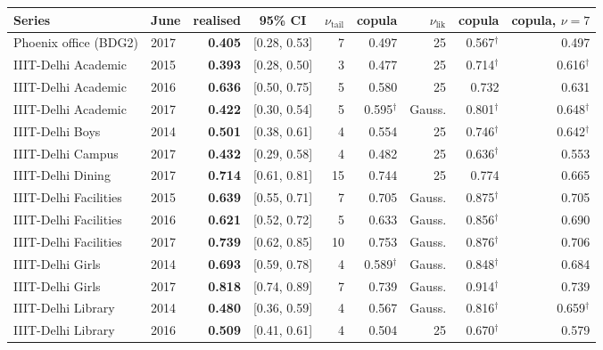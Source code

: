 \begin{table}[t]
\centering
\scriptsize
\setlength{\tabcolsep}{3pt}
\begin{tabular}{llrcrrrrr}
\toprule
Series & June & realised & 95\% CI & $\nu_{\mathrm{tail}}$ & copula & $\nu_{\mathrm{lik}}$ & copula & copula, $\nu{=}7$ \\
\midrule
Phoenix office (BDG2) & 2017 & \textbf{0.405} & [0.28, 0.53] & 7 & 0.497 & 25 & 0.567$^\dagger$ & 0.497 \\
\midrule
IIIT-Delhi Academic & 2015 & \textbf{0.393} & [0.28, 0.50] & 3 & 0.477 & 25 & 0.714$^\dagger$ & 0.616$^\dagger$ \\
IIIT-Delhi Academic & 2016 & \textbf{0.636} & [0.50, 0.75] & 5 & 0.580 & 25 & 0.732 & 0.631 \\
IIIT-Delhi Academic & 2017 & \textbf{0.422} & [0.30, 0.54] & 5 & 0.595$^\dagger$ & Gauss. & 0.801$^\dagger$ & 0.648$^\dagger$ \\
IIIT-Delhi Boys & 2014 & \textbf{0.501} & [0.38, 0.61] & 4 & 0.554 & 25 & 0.746$^\dagger$ & 0.642$^\dagger$ \\
IIIT-Delhi Campus & 2017 & \textbf{0.432} & [0.29, 0.58] & 4 & 0.482 & 25 & 0.636$^\dagger$ & 0.553 \\
IIIT-Delhi Dining & 2017 & \textbf{0.714} & [0.61, 0.81] & 15 & 0.744 & 25 & 0.774 & 0.665 \\
IIIT-Delhi Facilities & 2015 & \textbf{0.639} & [0.55, 0.71] & 7 & 0.705 & Gauss. & 0.875$^\dagger$ & 0.705 \\
IIIT-Delhi Facilities & 2016 & \textbf{0.621} & [0.52, 0.72] & 5 & 0.633 & Gauss. & 0.856$^\dagger$ & 0.690 \\
IIIT-Delhi Facilities & 2017 & \textbf{0.739} & [0.62, 0.85] & 10 & 0.753 & Gauss. & 0.876$^\dagger$ & 0.706 \\
IIIT-Delhi Girls & 2014 & \textbf{0.693} & [0.59, 0.78] & 4 & 0.589$^\dagger$ & Gauss. & 0.848$^\dagger$ & 0.684 \\
IIIT-Delhi Girls & 2017 & \textbf{0.818} & [0.74, 0.89] & 7 & 0.739 & Gauss. & 0.914$^\dagger$ & 0.739 \\
IIIT-Delhi Library & 2014 & \textbf{0.480} & [0.36, 0.59] & 4 & 0.567 & Gauss. & 0.816$^\dagger$ & 0.659$^\dagger$ \\
IIIT-Delhi Library & 2016 & \textbf{0.509} & [0.41, 0.61] & 4 & 0.504 & 25 & 0.670$^\dagger$ & 0.579 \\
\bottomrule
\end{tabular}

\end{table}
